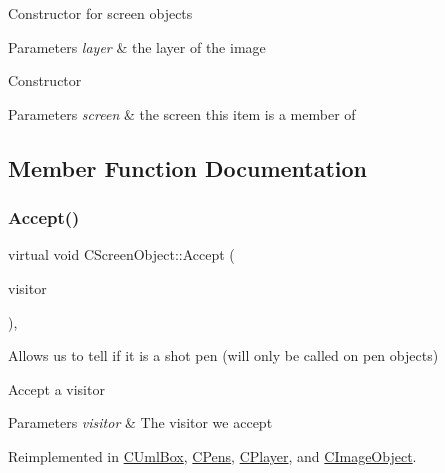 Constructor for screen objects 
\begin{DoxyParams}{Parameters}
{\em layer} & the layer of the image\\
\hline
\end{DoxyParams}
Constructor 
\begin{DoxyParams}{Parameters}
{\em screen} & the screen this item is a member of \\
\hline
\end{DoxyParams}


\subsection{Member Function Documentation}
\mbox{\label{class_c_screen_object_a1420b59508fdab637367654438223832}} 
\subsubsection{\texorpdfstring{Accept()}{Accept()}}
{\footnotesize\ttfamily virtual void C\+Screen\+Object\+::\+Accept (\begin{DoxyParamCaption}\item[{\mbox{\hyperlink{class_c_visitor}{C\+Visitor}} $\ast$}]{visitor }\end{DoxyParamCaption})\hspace{0.3cm}{\ttfamily [inline]}, {\ttfamily [virtual]}}



Allows us to tell if it is a shot pen (will only be called on pen objects) 

Accept a visitor 
\begin{DoxyParams}{Parameters}
{\em visitor} & The visitor we accept \\
\hline
\end{DoxyParams}


Reimplemented in \mbox{\hyperlink{class_c_uml_box_a492e1d6063c938e7f099fe5640fc669b}{C\+Uml\+Box}}, \mbox{\hyperlink{class_c_pens_a054fe093d31223c2ad66ab328e158f33}{C\+Pens}}, \mbox{\hyperlink{class_c_player_a524a0fd1d55d4ac0a55d00d0492018f8}{C\+Player}}, and \mbox{\hyperlink{class_c_image_object_a7130a9fa130c2028aba6c28dcfc876d5}{C\+Image\+Object}}.

\mbox{\label{class_c_screen_object_afba7405527ca6eecad5f09c09e539df9}} 
